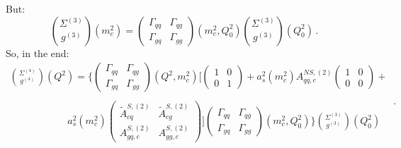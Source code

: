 \documentclass[10pt,a4paper]{article}
\begin{document}
But:
\begin{equation}\label{couple3mcQ0}
{\Sigma^{(3)} \choose g^{(3)}}(m_c^2) = \begin{pmatrix} \Gamma_{qq} & \Gamma_{qg} \\ \Gamma_{gq}& \Gamma_{gg}\end{pmatrix}(m_c^2,Q_0^2){\Sigma^{(3)} \choose g^{(3)}}(Q_0^2)\,.
\end{equation}
So, in the end:
\begin{equation}\label{couple43QQ0}
\begin{array}{l}
\displaystyle {\Sigma^{(4)} \choose g^{(4)}}(Q^2) = \Bigg\{\begin{pmatrix} \Gamma_{qq} & \Gamma_{qg} \\ \Gamma_{gq}& \Gamma_{gg}\end{pmatrix}(Q^2,m_c^2)\Bigg[\begin{pmatrix} 1 & 0 \\ 0 & 1\end{pmatrix}+a_s^2(m_c^2)A_{qq,c}^{N\!S,(2)}\begin{pmatrix} 1 & 0 \\ 0 & 0\end{pmatrix}+\\
\\
\hspace{70pt}\displaystyle a_s^2(m_c^2)\begin{pmatrix} \tilde{A}^{S,(2)}_{cq} & \tilde{A}^{S,(2)}_{cg} \\A^{S,(2)}_{gq,c} & A_{gg,c}^{S,(2)}\end{pmatrix}\Bigg]\begin{pmatrix} \Gamma_{qq} & \Gamma_{qg} \\ \Gamma_{gq}& \Gamma_{gg}\end{pmatrix}(m_c^2,Q_0^2)\Bigg\}{\Sigma^{(3)} \choose g^{(3)}}(Q_0^2)
\end{array}\,.
\end{equation}
\end{document}
